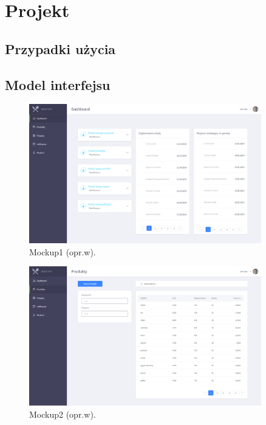 \chapter{Projekt}
\section{Przypadki użycia}
\section{Model interfejsu}
\begin{minipage}{\textwidth}
    \begin{figure}[H]
        \centering\includegraphics[width=0.9\textwidth]{img/mockups/mockup1.png}
        \caption{Mockup1 (opr.w).}\label{rysunek:mockup1}
    \end{figure}
\end{minipage}

\begin{minipage}{\textwidth}
    \begin{figure}[H]
        \centering\includegraphics[width=0.9\textwidth]{img/mockups/mockup2.png}
        \caption{Mockup2 (opr.w).}\label{rysunek:mockup2}
    \end{figure}
\end{minipage}

